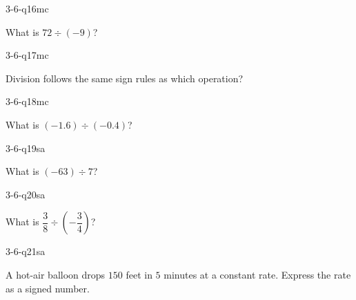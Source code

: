 \begin{practiceQuestion}{3-6-q16}{mc}
\begin{questionText}
What is $72 \div (-9)$?
\end{questionText}
\end{practiceQuestion}

\begin{practiceQuestion}{3-6-q17}{mc}
\begin{questionText}
Division follows the same sign rules as which operation?
\end{questionText}
\end{practiceQuestion}

\begin{practiceQuestion}{3-6-q18}{mc}
\begin{questionText}
What is $(-1.6) \div (-0.4)$?
\end{questionText}
\end{practiceQuestion}


\begin{practiceQuestion}{3-6-q19}{sa}
\begin{questionText}
What is $(-63) \div 7$?
\end{questionText}
\end{practiceQuestion}

\begin{practiceQuestion}{3-6-q20}{sa}
\begin{questionText}
What is $\dfrac{3}{8} \div \left(-\dfrac{3}{4}\right)$?
\end{questionText}
\end{practiceQuestion}

\begin{practiceQuestion}{3-6-q21}{sa}
\begin{questionText}
A hot-air balloon drops $150$ feet in $5$ minutes at a constant rate. Express the rate as a signed number.
\end{questionText}
\end{practiceQuestion}

